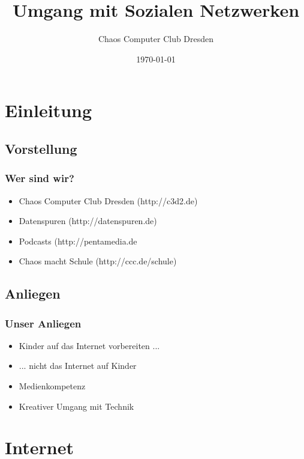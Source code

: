 \documentclass{beamer}
\title{Umgang mit Sozialen Netzwerken}
\author{Chaos Computer Club Dresden}
\date{\today}
\begin{document}
\maketitle

\section{Einleitung}

\subsection{Vorstellung}

\begin{frame}
  \frametitle{Wer sind wir?}
  \begin{itemize}
    \item<2-> Chaos Computer Club Dresden (http://c3d2.de)
      \note{}
    \item<3-> Datenspuren (http://datenspuren.de)
    \item<4-> Podcasts (http://pentamedia.de
    \item<5-> Chaos macht Schule (http://ccc.de/schule)
      \note{}
  \end{itemize}
\end{frame}

\subsection{Anliegen}

\begin{frame}
  \frametitle{Unser Anliegen}
  \begin{itemize}
    \item<2-> Kinder auf das Internet vorbereiten ...
    \item<3-> ... nicht das Internet auf Kinder
    \item<4-> Medienkompetenz
    \item<5-> Kreativer Umgang mit Technik
  \end{itemize}
\end{frame}

\frame{\tableofcontents[hideallsubsections]}

\section{Internet}
\end{document}
